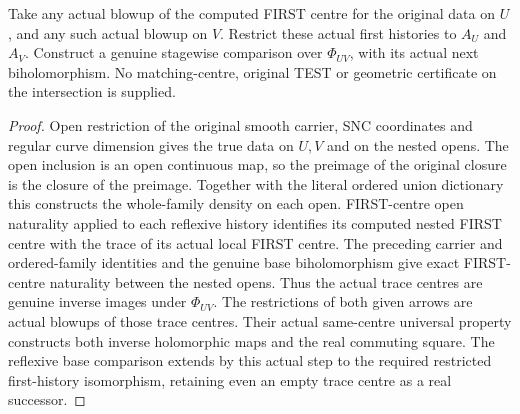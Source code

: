 \begin{theorem}
\label{hir:sharp-actual-curve-overlap-first-blowups}
\leanok
Take any actual blowup of the computed FIRST centre for the original data on
$U$, and any such actual blowup on $V$. Restrict these actual first histories
to $A_U$ and $A_V$. Construct a genuine stagewise comparison over $\Phi_{UV}$,
with its actual next biholomorphism. No matching-centre, original TEST or
geometric certificate on the intersection is supplied.
\end{theorem}
\begin{proof}
Open restriction of the original smooth carrier, SNC coordinates and regular
curve dimension gives the true data on $U,V$ and on the nested opens.
The open inclusion is an open continuous map, so the preimage of the original
closure is the closure of the preimage. Together with the literal ordered
union dictionary this constructs the whole-family density on each open.
FIRST-centre open naturality applied to each reflexive history identifies its
computed nested FIRST centre with the trace of its actual local FIRST centre.
The preceding carrier and ordered-family identities and the genuine base
biholomorphism give exact FIRST-centre naturality between the nested opens.
Thus the actual trace centres are genuine inverse images under $\Phi_{UV}$.
The restrictions of both given arrows are actual blowups of those trace
centres. Their actual same-centre universal property constructs both inverse
holomorphic maps and the real commuting square. The reflexive base comparison
extends by this actual step to the required restricted first-history
isomorphism, retaining even an empty trace centre as a real successor.
\end{proof}

